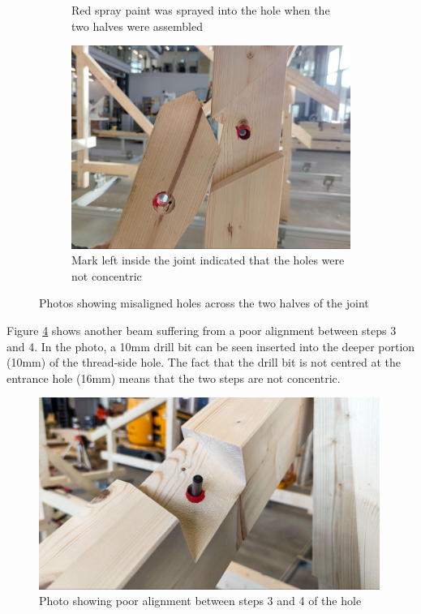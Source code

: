 \begin{figure}[!h]
\begin{subfigure}[b]{0.49\textwidth}
        \caption{Red spray paint was sprayed into the hole when the two halves were assembled}
        \label{fig:red-paint-sprayed}
    \end{subfigure}
    \hfill
    \begin{subfigure}[b]{0.49\textwidth}
        \centering
        \includegraphics[width=\textwidth]{images/7b/img72.jpg}
        \caption{Mark left inside the joint indicated that the holes were not concentric}
        \label{fig:mark-left-inside-the-joint}
    \end{subfigure}
    \caption{Photos showing misaligned holes across the two halves of the joint}
    \label{fig:misaligned-holes-across-joint}
\end{figure}

Figure \ref{fig:poor-alignment-step-3-4} shows another beam suffering from a poor alignment between steps 3 and 4. In the photo, a 10mm drill bit can be seen inserted into the deeper portion (10mm) of the thread-side hole. The fact that the drill bit is not centred at the entrance hole (16mm) means that the two steps are not concentric.

\begin{figure}[!h]
    \centering
    \includegraphics[width=0.99\textwidth]{images/7b/img73.jpg}
    \caption{Photo showing poor alignment between steps 3 and 4 of the hole}
    \label{fig:poor-alignment-step-3-4}
\end{figure}


